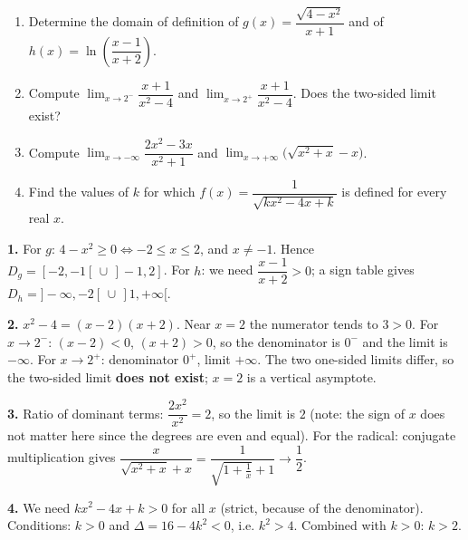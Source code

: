 \documentclass[11pt]{article}
\begin{document}
\begin{exercice}
\begin{enumerate}
\item Determine the domain of definition of $g(x) = \dfrac{\sqrt{4 - x^2}}{x + 1}$ and of $h(x) = \ln\!\left(\dfrac{x-1}{x+2}\right)$.
\item Compute $\lim_{x \to 2^-} \dfrac{x+1}{x^2 - 4}$ and $\lim_{x \to 2^+} \dfrac{x+1}{x^2 - 4}$. Does the two-sided limit exist?
\item Compute $\lim_{x \to -\infty} \dfrac{2x^2 - 3x}{x^2 + 1}$ and $\lim_{x \to +\infty} \bigl(\sqrt{x^2 + x} - x\bigr)$.
\item Find the values of $k$ for which $f(x) = \dfrac{1}{\sqrt{kx^2 - 4x + k}}$ is defined for every real $x$.
\end{enumerate}
\end{exercice}

\begin{corrige}[Exercise 1]
\textbf{1.} For $g$: $4 - x^2 \geq 0 \iff -2 \leq x \leq 2$, and $x \neq -1$. Hence $D_g = [-2, -1[ \,\cup\, ]-1, 2]$. For $h$: we need $\dfrac{x-1}{x+2} > 0$; a sign table gives $D_h = ]-\infty, -2[ \,\cup\, ]1, +\infty[$.

\textbf{2.} $x^2 - 4 = (x-2)(x+2)$. Near $x = 2$ the numerator tends to $3 > 0$. For $x \to 2^-$: $(x-2) < 0$, $(x+2) > 0$, so the denominator is $0^-$ and the limit is $-\infty$. For $x \to 2^+$: denominator $0^+$, limit $+\infty$. The two one-sided limits differ, so the two-sided limit \textbf{does not exist}; $x = 2$ is a vertical asymptote.

\textbf{3.} Ratio of dominant terms: $\dfrac{2x^2}{x^2} = 2$, so the limit is $2$ (note: the sign of $x$ does not matter here since the degrees are even and equal). For the radical: conjugate multiplication gives $\dfrac{x}{\sqrt{x^2+x} + x} = \dfrac{1}{\sqrt{1 + \frac{1}{x}} + 1} \to \dfrac{1}{2}$.

\textbf{4.} We need $kx^2 - 4x + k > 0$ for all $x$ (strict, because of the denominator). Conditions: $k > 0$ and $\Delta = 16 - 4k^2 < 0$, i.e. $k^2 > 4$. Combined with $k > 0$: $k > 2$.
\end{corrige}
\end{document}
